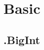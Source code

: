 \documentclass[10pt,twocolumn,oneside]{article}
\begin{document}
\pagestyle{fancy}
\fancyfoot{}
\fancyhead[R]{\thepage}
\renewcommand{\headrulewidth}{0.4pt}
\renewcommand{\contentsname}{Contents} 

\scriptsize
\tableofcontents

\newpage

\section{Basic}
\subsection{.BigInt}

\newpage
\end{document}
